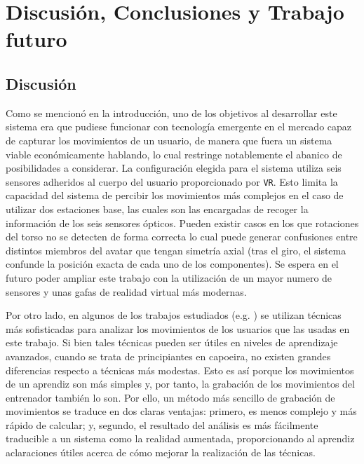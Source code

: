 \chapter{Discusión, Conclusiones y Trabajo futuro }
\label{cap6:sec:Conclusiones y Trabajo futuro}

\section{Discusión}

Como se mencionó en la introducción, uno de los objetivos al desarrollar este sistema era que pudiese funcionar con tecnología emergente en el mercado capaz de capturar los movimientos de un usuario, de manera que fuera un sistema viable económicamente hablando, lo cual restringe notablemente el abanico de posibilidades a considerar. La configuración elegida para el sistema utiliza seis sensores adheridos al cuerpo del usuario proporcionado por \texttt{VR}. Esto limita la capacidad del sistema de percibir los movimientos más complejos en el caso de utilizar dos estaciones base, las cuales son las encargadas de recoger la información de los seis sensores ópticos. Pueden existir casos en los que rotaciones del torso no se detecten de forma correcta lo cual puede generar confusiones entre distintos miembros del avatar que tengan simetría axial (tras el giro, el sistema confunde la posición exacta de cada uno de los componentes). Se espera en el futuro poder ampliar este trabajo con la utilización de un mayor numero de sensores y unas gafas de realidad virtual más modernas.

Por otro lado, en algunos de los trabajos estudiados (e.g. \cite{Keerthy:Thesis:2012,Kyan:2015:ABD:2753829.2735951}) se utilizan técnicas más sofisticadas para analizar los movimientos de los usuarios que las usadas en este trabajo. Si bien tales técnicas pueden ser útiles en niveles de aprendizaje avanzados, cuando se trata de principiantes en capoeira, no existen grandes diferencias respecto a técnicas más modestas. Esto es así porque los movimientos de un aprendiz son más simples y, por tanto, la grabación de los movimientos del entrenador también lo son. Por ello, un método más sencillo de grabación de movimientos se traduce en dos claras ventajas: primero, es menos complejo y más rápido de calcular; y, segundo, el resultado del análisis es más fácilmente traducible a un sistema como la realidad aumentada, proporcionando al aprendiz aclaraciones útiles acerca de cómo mejorar la realización de las técnicas.

